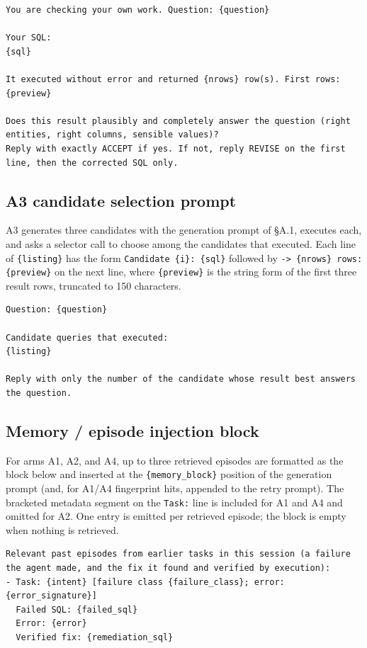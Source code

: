 \documentclass[sigconf, nonacm]{acmart}
\begin{document}
\begin{Verbatim}[fontsize=\small, breaklines=true, breakanywhere=true]
You are checking your own work. Question: {question}

Your SQL:
{sql}

It executed without error and returned {nrows} row(s). First rows: {preview}

Does this result plausibly and completely answer the question (right entities, right columns, sensible values)?
Reply with exactly ACCEPT if yes. If not, reply REVISE on the first line, then the corrected SQL only.
\end{Verbatim}

\subsection{A3 candidate selection prompt}

A3 generates three candidates with the generation prompt of \S A.1, executes each, and asks a selector call to choose among the candidates that executed. Each line of \texttt{\{listing\}} has the form \texttt{Candidate \{i\}: \{sql\}} followed by \texttt{-> \{nrows\} rows: \{preview\}} on the next line, where \texttt{\{preview\}} is the string form of the first three result rows, truncated to 150 characters.

\begin{Verbatim}[fontsize=\small, breaklines=true, breakanywhere=true]
Question: {question}

Candidate queries that executed:
{listing}

Reply with only the number of the candidate whose result best answers the question.
\end{Verbatim}

\subsection{Memory / episode injection block}

For arms A1, A2, and A4, up to three retrieved episodes are formatted as the block below and inserted at the \texttt{\{\hspace{0pt}memory\_block\}} position of the generation prompt (and, for A1/A4 fingerprint hits, appended to the retry prompt). The bracketed metadata segment on the \texttt{Task:} line is included for A1 and A4 and omitted for A2. One entry is emitted per retrieved episode; the block is empty when nothing is retrieved.

\begin{Verbatim}[fontsize=\small, breaklines=true, breakanywhere=true]
Relevant past episodes from earlier tasks in this session (a failure the agent made, and the fix it found and verified by execution):
- Task: {intent} [failure class {failure_class}; error: {error_signature}]
  Failed SQL: {failed_sql}
  Error: {error}
  Verified fix: {remediation_sql}
\end{Verbatim}
\end{document}
